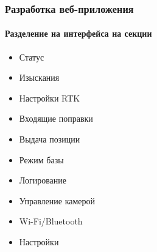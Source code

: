 \documentclass[xetex,t]{beamer}
\begin{document}
%
%
\begin{frame}
  \frametitle{Разработка веб-приложения}
  \framesubtitle{Разделение на интерфейса на секции}

  \begin{minipage}[c]{\textwidth}
    \centering
    \footnotesize
    \vskip 0.5cm
    \begin{minipage}[c]{.32\textwidth}
      \begin{itemize}
        \item<1> Статус
        \item<2> Изыскания
        \item<3> Настройки RTK
        \item<4> Входящие поправки
        \item<5> Выдача позиции
        \item<6> Режим базы
        \item<7> Логирование
        \item<8> Управление камерой
        \item<9> Wi-Fi/Bluetooth
        \item<10> Настройки
      \end{itemize}
    \end{minipage}
    \hspace{1em}
    \begin{minipage}[c]{.64\textwidth}
\end{minipage}
\end{minipage}
\end{frame}
\end{document}
